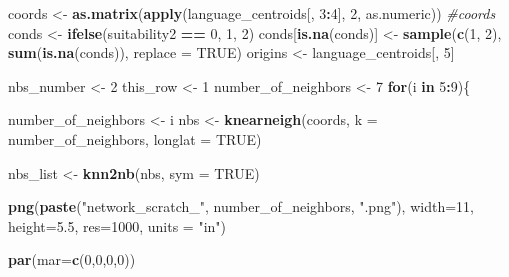 \documentclass[]{book}
\newenvironment{Shaded}{\begin{snugshade}}{\end{snugshade}}
\newcommand{\KeywordTok}[1]{\textcolor[rgb]{0.13,0.29,0.53}{\textbf{{#1}}}}
\newcommand{\DataTypeTok}[1]{\textcolor[rgb]{0.13,0.29,0.53}{{#1}}}
\newcommand{\DecValTok}[1]{\textcolor[rgb]{0.00,0.00,0.81}{{#1}}}
\newcommand{\FloatTok}[1]{\textcolor[rgb]{0.00,0.00,0.81}{{#1}}}
\newcommand{\StringTok}[1]{\textcolor[rgb]{0.31,0.60,0.02}{{#1}}}
\newcommand{\CommentTok}[1]{\textcolor[rgb]{0.56,0.35,0.01}{\textit{{#1}}}}
\newcommand{\OtherTok}[1]{\textcolor[rgb]{0.56,0.35,0.01}{{#1}}}
\newcommand{\ControlFlowTok}[1]{\textcolor[rgb]{0.13,0.29,0.53}{\textbf{{#1}}}}
\newcommand{\OperatorTok}[1]{\textcolor[rgb]{0.81,0.36,0.00}{\textbf{{#1}}}}
\newcommand{\NormalTok}[1]{{#1}}
\theoremstyle{definition}
\theoremstyle{definition}
\theoremstyle{definition}
\theoremstyle{remark}
\begin{document}
\begin{Shaded}
\begin{Highlighting}[]
\NormalTok{coords <-}\StringTok{ }\KeywordTok{as.matrix}\NormalTok{(}\KeywordTok{apply}\NormalTok{(language_centroids[, }\DecValTok{3}\OperatorTok{:}\DecValTok{4}\NormalTok{], }\DecValTok{2}\NormalTok{, as.numeric)) }\CommentTok{#coords}
\NormalTok{conds <-}\StringTok{ }\KeywordTok{ifelse}\NormalTok{(suitability2 }\OperatorTok{==}\StringTok{ }\DecValTok{0}\NormalTok{, }\DecValTok{1}\NormalTok{, }\DecValTok{2}\NormalTok{)}
\NormalTok{conds[}\KeywordTok{is.na}\NormalTok{(conds)] <-}\StringTok{ }\KeywordTok{sample}\NormalTok{(}\KeywordTok{c}\NormalTok{(}\DecValTok{1}\NormalTok{, }\DecValTok{2}\NormalTok{), }\KeywordTok{sum}\NormalTok{(}\KeywordTok{is.na}\NormalTok{(conds)), }\DataTypeTok{replace =} \OtherTok{TRUE}\NormalTok{) }
\NormalTok{origins <-}\StringTok{ }\NormalTok{language_centroids[, }\DecValTok{5}\NormalTok{]}



\NormalTok{nbs_number <-}\StringTok{ }\DecValTok{2}
\NormalTok{this_row <-}\StringTok{ }\DecValTok{1}
\NormalTok{number_of_neighbors <-}\StringTok{ }\DecValTok{7}
\ControlFlowTok{for}\NormalTok{(i }\ControlFlowTok{in} \DecValTok{5}\OperatorTok{:}\DecValTok{9}\NormalTok{)\{}

\NormalTok{number_of_neighbors <-}\StringTok{ }\NormalTok{i}
\NormalTok{nbs <-}\StringTok{ }\KeywordTok{knearneigh}\NormalTok{(coords, }\DataTypeTok{k =}\NormalTok{ number_of_neighbors, }\DataTypeTok{longlat =} \OtherTok{TRUE}\NormalTok{) }

\NormalTok{nbs_list <-}\StringTok{ }\KeywordTok{knn2nb}\NormalTok{(nbs, }\DataTypeTok{sym =} \OtherTok{TRUE}\NormalTok{)}


\KeywordTok{png}\NormalTok{(}\KeywordTok{paste}\NormalTok{(}\StringTok{"network_scratch_"}\NormalTok{, number_of_neighbors, }\StringTok{".png"}\NormalTok{), }\DataTypeTok{width=}\DecValTok{11}\NormalTok{, }\DataTypeTok{height=}\FloatTok{5.5}\NormalTok{, }\DataTypeTok{res=}\DecValTok{1000}\NormalTok{, }\DataTypeTok{units =} \StringTok{"in"}\NormalTok{)}


\KeywordTok{par}\NormalTok{(}\DataTypeTok{mar=}\KeywordTok{c}\NormalTok{(}\DecValTok{0}\NormalTok{,}\DecValTok{0}\NormalTok{,}\DecValTok{0}\NormalTok{,}\DecValTok{0}\NormalTok{))}


\end{Highlighting}
\end{Shaded}
\end{document}
